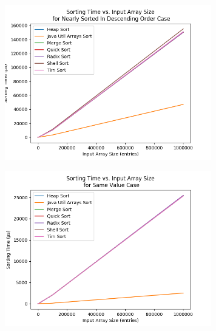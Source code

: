 \begin{figure}[!htp]
\centering
\includegraphics[width=9cm]{figures/plots_without_BubbleSort_InsertionSort/sorting_time_vs_input_array_size_NearlySortedInDescendingOrderCase.png}
\end{figure}

\begin{figure}[!htp]
\centering
\includegraphics[width=9cm]{figures/plots_without_BubbleSort_InsertionSort/sorting_time_vs_input_array_size_SameValueCase.png}
\end{figure}
